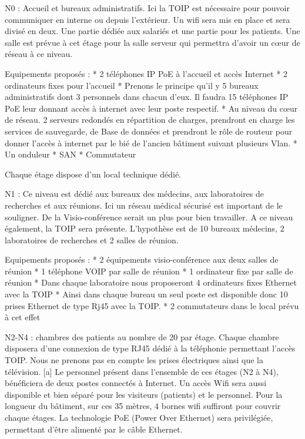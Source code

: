 N0 : Accueil et bureaux administratifs. Ici la TOIP est nécessaire pour pouvoir communiquer en interne ou depuis l’extérieur. Un wifi sera mis en place et sera divisé en deux. Une partie dédiée aux salariés et une partie pour les patients. Une salle est prévue à cet étage pour la salle serveur qui permettra d’avoir un cœur de réseau à ce niveau.


Equipements proposés :
* 2 téléphones IP PoE à l’accueil et accès Internet
* 2 ordinateurs fixes pour l’accueil
* Prenons le principe qu’il y 5 bureaux administratifs dont 3 personnels dans chacun d’eux. Il faudra 15 téléphones IP PoE leur donnant accès à internet avec leur poste respectif.
* Au niveau du cœur de réseau. 2 serveurs redondés en répartition de charges, prendront en charge les services de sauvegarde, de Base de données et prendront le rôle de routeur pour donner l’accès à internet par le bié de l’ancien bâtiment suivant plusieurs Vlan.
* Un onduleur
* SAN
* Commutateur


Chaque étage dispose d'un local technique dédié.


N1 : Ce niveau est dédié aux bureaux des médecins, aux laboratoires de recherches et aux réunions. Ici un réseau médical sécurisé est important de le souligner. De la Visio-conférence serait un plus pour bien travailler. A ce niveau également, la TOIP sera présente. L’hypothèse est de 10 bureaux médecins, 2 laboratoires de recherches et 2 salles de réunion.


Equipements proposés :
* 2 équipements visio-conférence aux deux salles de réunion
* 1 téléphone VOIP par salle de réunion
* 1 ordinateur fixe par salle de réunion
* Dans chaque laboratoire nous proposeront 4 ordinateurs fixes  Ethernet avec la TOIP
* Ainsi dans chaque bureau un seul poste est disponible donc 10 prises Ethernet de type Rj45 avec la TOIP.
* 2 commutateurs dans le local prévu à cet effet




N2-N4 : chambres des patients au nombre de 20 par étage.  Chaque chambre disposera d’une connexion de type RJ45 dédié à la téléphonie permettant l’accès TOIP. Nous ne prenons pas en compte les prises électriques ainsi que la télévision. [a]
Le personnel présent dans l’ensemble de ces étages (N2 à N4), bénéficiera de deux postes connectés à Internet.
Un accès Wifi sera aussi disponible et bien séparé pour les visiteurs (patients) et le personnel. Pour la longueur du bâtiment, sur ces 35 mètres, 4 bornes wifi suffiront pour couvrir chaque étages. La technologie PoE (Power Over Ethernet) sera privilégiée, permettant d’être alimenté par le câble Ethernet.


